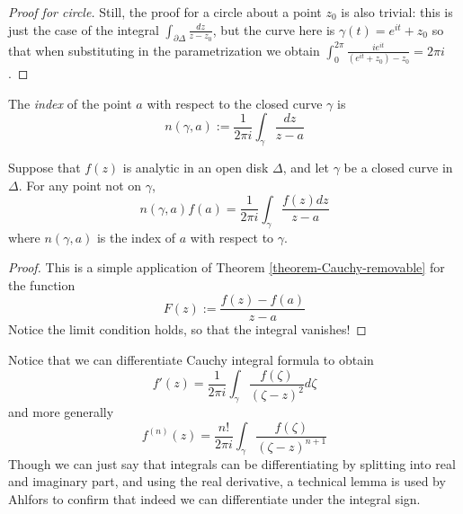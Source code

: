 \begin{proof}[Proof for circle]
Still, the proof for a circle about a point $z_0$ is also trivial: this is just
the case of the integral $\int_{\partial\Delta}\frac{dz}{z-z_0}$, but the curve
here is  $\gamma(t)=e^{it}+z_0$ so that when substituting in the parametrization
we obtain $\int_0^{2\pi}\frac{ie^{it}}{(e^{it}+z_0)-z_0}=2\pi i$.
\end{proof}

\begin{definition}
\label{definition-index}
The {\it index} of the point $a$ with respect to the closed curve $\gamma$ is
\begin{equation}
\label{equation-index}
n(\gamma,a):=\frac{1}{2\pi i}\int_\gamma\frac{dz}{z-a}
\end{equation}
\end{definition}

\begin{theorem}
\label{theorem-Cauchy-integral-formula}
\begin{reference}
\cite[Section 2.2, Theorem 6]{ahl}
\end{reference}
Suppose that $f(z)$ is analytic in an open disk $\Delta$, and let $\gamma$ be a
closed curve in $\Delta$. For any point not on $\gamma$,
\begin{equation}
\label{equation-Cauchy-formula-with-index}
n(\gamma,a)f(a)=\frac{1}{2\pi i}\int_\gamma\frac{f(z)dz}{z-a}
\end{equation}
where $n(\gamma,a)$ is the index of $a$ with respect to $\gamma$.
\end{theorem}

\begin{proof}
This is a simple application of Theorem \ref{theorem-Cauchy-removable} for the
function
$$
F(z):=\frac{f(z)-f(a)}{z-a}
$$
Notice the limit condition holds, so that the integral vanishes!
\end{proof}

\noindent
Notice that we can differentiate Cauchy integral formula to obtain
\begin{equation}
\label{equation-first-derivative-Cauchy-formula}
f'(z)=\frac{1}{2\pi i}\int_\gamma\frac{f(\zeta)}{(\zeta-z)^2}d\zeta
\end{equation}
and more generally
$$
f^{(n)}(z)=\frac{n!}{2\pi i}\int_\gamma \frac{f(\zeta)}{(\zeta-z)^{n+1}}
$$
Though we can just say that integrals can be differentiating by splitting into
real and imaginary part, and using the real derivative, a technical lemma is 
used by Ahlfors to confirm that indeed we can differentiate
under the integral sign.

